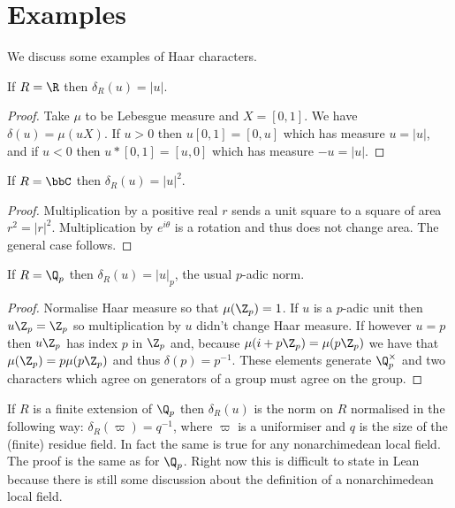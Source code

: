 \section{Examples}

We discuss some examples of Haar characters.

\begin{lemma}
  \label{ringHaarChar_real}
  If $R=\R$ then $\delta_R(u)=|u|$.
  \leanok
\end{lemma}
\begin{proof}
  \leanok
  Take $\mu$ to be Lebesgue measure and $X=[0,1]$.
We have $\delta(u)=\mu(uX)$. If $u>0$ then $u[0,1]=[0,u]$ which has measure $u=|u|$,
and if $u<0$ then $u*[0,1]=[u,0]$ which has measure $-u=|u|$.
\end{proof}

\begin{lemma}
  \label{ringHaarChar_complex}
  \leanok
  If $R=\bbC$ then $\delta_R(u)=|u|^2$.
\end{lemma}
\begin{proof}
  \leanok
  Multiplication by a positive real $r$ sends a unit square to a square of area $r^2=|r|^2$.
  Multiplication by $e^{i\theta}$ is a rotation and thus does not change area.
  The general case follows.
\end{proof}

\begin{lemma}
  \label{ringHaarChar_padic}
  \leanok
  If $R=\Q_p$ then $\delta_R(u)=|u|_p$, the usual $p$-adic norm.
\end{lemma}
\begin{proof}
  \leanok
  Normalise Haar measure so that $\mu(\Z_p)=1$.
  If $u$ is a $p$-adic unit then $u\Z_p=\Z_p$ so multiplication by $u$ didn't change
  Haar measure. If however $u=p$ then $u\Z_p$ has index $p$ in $\Z_p$ and, because
  $\mu(i+p\Z_p)=\mu(p\Z_p)$ we have that $\mu(\Z_p)=p\mu(p\Z_p)$ and thus $\delta(p)=p^{-1}$.
  These elements generate $\Q_p^\times$ and two characters which agree on generators
  of a group must agree on the group.
\end{proof}

\begin{remark}
If $R$ is a finite extension of $\Q_p$ then $\delta_R(u)$
is the norm on $R$ normalised in the following way:
$\delta_R(\varpi)=q^{-1}$, where $\varpi$ is a uniformiser
and $q$ is the size of the (finite) residue field. In fact the same is true
for any nonarchimedean local field. The proof is
the same as for $\Q_p$. Right now this is difficult to state in Lean because
there is still some discussion about the definition of a nonarchimedean local field.
\end{remark}

